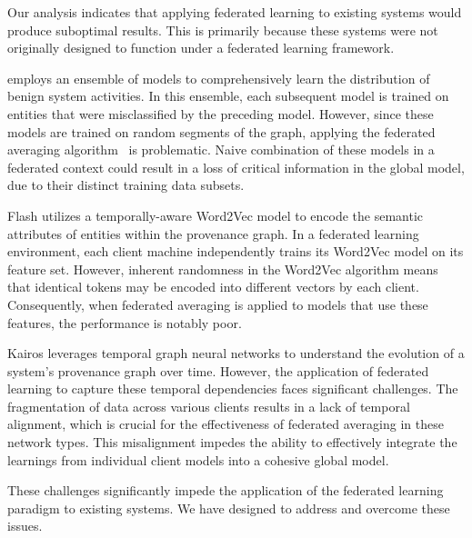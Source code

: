 Our analysis indicates that applying federated learning to existing systems would produce suboptimal results. This is primarily because these systems were not originally designed to function under a federated learning framework.

\threatrace employs an ensemble of \gnnshort models to comprehensively learn the distribution of benign system activities. In this ensemble, each subsequent model is trained on entities that were misclassified by the preceding model. However, since these models are trained on random segments of the graph, applying the federated averaging algorithm~\cite{mcmahan2017communication} is problematic. Naive combination of these models in a federated context could result in a loss of critical information in the global model, due to their distinct training data subsets.

Flash utilizes a temporally-aware Word2Vec model to encode the semantic attributes of entities within the provenance graph. In a federated learning environment, each client machine independently trains its Word2Vec model on its feature set. However, inherent randomness in the Word2Vec algorithm means that identical tokens may be encoded into different vectors by each client. Consequently, when federated averaging is applied to \gnn models that use these features, the performance is notably poor.

Kairos leverages temporal graph neural networks to understand the evolution of a system's provenance graph over time. However, the application of federated learning to capture these temporal dependencies faces significant challenges. The fragmentation of data across various clients results in a lack of temporal alignment, which is crucial for the effectiveness of federated averaging in these network types. This misalignment impedes the ability to effectively integrate the learnings from individual client models into a cohesive global model.

These challenges significantly impede the application of the federated learning paradigm to existing systems. We have designed \Sys to address and overcome these issues.